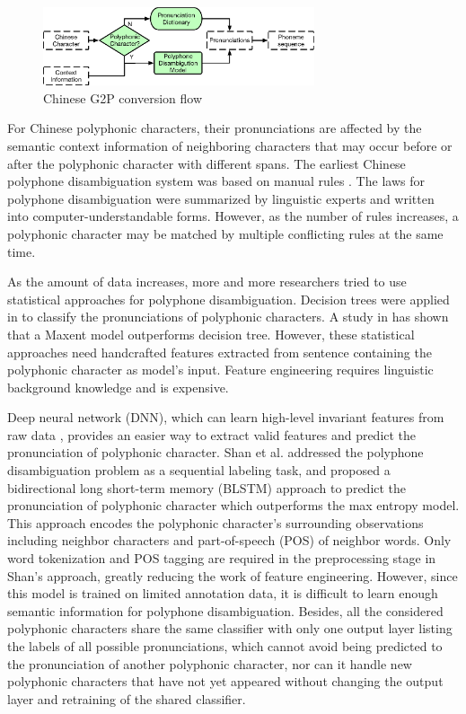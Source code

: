 \documentclass[a4paper]{article}
\begin{document}
\begin{figure}[t]
	
	\begin{minipage}[b]{1.0\linewidth}
		\centerline{\includegraphics[width=8cm]{pics3/ChineseG2P.eps}}
	\end{minipage}
	\caption{Chinese G2P conversion flow}
	\label{fig:chineseG2P}
\end{figure}

For Chinese polyphonic characters, their pronunciations are affected by the semantic context information \cite{lilinhui2010} of neighboring characters that may occur before or after the polyphonic character with different spans. The earliest Chinese polyphone disambiguation system was based on manual rules \cite{dajunzhang2000, lianhongcai1995}. The laws for polyphone disambiguation were summarized by linguistic experts  and written into computer-understandable forms. However, as the number of rules increases, a polyphonic character may be matched by multiple conflicting rules at the same time.

As the amount of data increases, more and more researchers tried to use statistical approaches for polyphone disambiguation. Decision trees were applied in \cite{wang1996broad} to classify the pronunciations of polyphonic characters. A study in \cite{fangzhouliu2007} has shown that a Maxent model outperforms decision tree. However, these statistical approaches need handcrafted features extracted from sentence containing the polyphonic character as model's input. Feature engineering requires linguistic background knowledge and is expensive.

Deep neural network (DNN), which can learn high-level invariant features from raw data \cite{bengio2013representation}, provides an easier way to extract valid features and predict the pronunciation of polyphonic character. Shan et al. \cite{shan2016bi} addressed the polyphone disambiguation problem as a sequential labeling task, and proposed a bidirectional long short-term memory (BLSTM) approach to predict the pronunciation of polyphonic character which outperforms the max entropy model. This approach encodes the polyphonic character’s surrounding observations including neighbor characters and part-of-speech (POS) of neighbor words. Only word tokenization and POS tagging are required in the preprocessing stage in Shan's approach, greatly reducing the work of feature engineering. However, since this model is trained on limited annotation data, it is difficult to learn enough semantic information for polyphone disambiguation. Besides, all the considered polyphonic characters share the same classifier with only one output layer listing the labels of all possible pronunciations, which cannot avoid being predicted to the pronunciation of another polyphonic character, nor can it handle new polyphonic characters that have not yet appeared without changing the output layer and retraining of the shared classifier.
\end{document}
